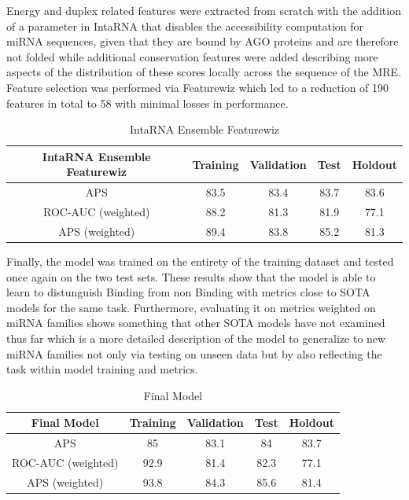 \documentclass[en,ack]{dimscthesis}
\begin{document}
Energy and duplex related features were extracted from scratch with the addition of a parameter in IntaRNA that disables the accessibility computation for miRNA sequences, given that they are bound by AGO proteins and are therefore not folded while additional conservation features were added describing more aspects of the distribution of these scores locally across the sequence of the MRE. Feature selection was performed via Featurewiz which led to a reduction of 190 features in total to 58 with minimal losses in performance. 

\begin{table}[H]
    \caption{IntaRNA Ensemble Featurewiz}
    \label{tbl:IntaRNA Ensemble Featurewiz}
    \begin{center} %
        \begin{tabular}{c|c|c|c|c}
            \textbf{IntaRNA Ensemble Featurewiz} & \textbf{Training} & \textbf{Validation}& \textbf{Test}& \textbf{Holdout} \\
            \hline
			APS & 83.5 & 83.4 & 83.7 & 83.6 \\
			ROC-AUC (weighted) & 88.2 & 81.3 & 81.9 & 77.1 \\
			APS (weighted) & 89.4 & 83.8 & 85.2 & 81.3 \\
            \hline
        \end{tabular}
    \end{center}
\end{table}

Finally, the model was trained on the entirety of the training dataset and tested once again on the two test sets. These results show that the model is able to learn to distunguish Binding from non Binding with metrics close to SOTA models for the same task. Furthermore, evaluating it on metrics weighted on miRNA families shows something that other SOTA models have not examined thus far which is a more detailed description of the model to generalize to new miRNA families not only via testing on unseen data but by also reflecting the task within model training and metrics.

\begin{table}[H]
    \caption{Final Model}
    \label{tbl:Final Model}
    \begin{center} %
        \begin{tabular}{c|c|c|c|c}
            \textbf{Final Model} & \textbf{Training} & \textbf{Validation}& \textbf{Test}& \textbf{Holdout} \\
            \hline
			APS & 85 & 83.1 & 84 & 83.7 \\
			ROC-AUC (weighted) & 92.9 & 81.4 & 82.3 & 77.1 \\
			APS (weighted) & 93.8 & 84.3 & 85.6 & 81.4 \\
            \hline
        \end{tabular}
    \end{center}
\end{table}
\end{document}

